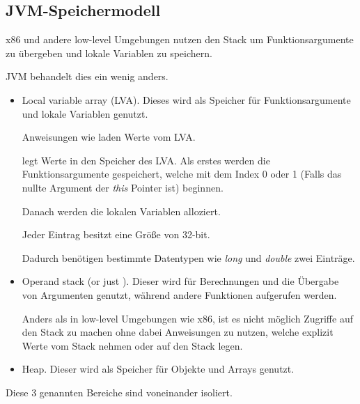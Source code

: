 \subsection{\ac{JVM}-Speichermodell}
x86 und andere low-level Umgebungen nutzen den Stack um Funktionsargumente zu übergeben
und lokale Variablen zu speichern.

\ac{JVM} behandelt dies ein wenig anders.

\begin{itemize}
	\item Local variable array (\ac{LVA}).
	Dieses wird als Speicher für Funktionsargumente und lokale Variablen genutzt.
	
	Anweisungen wie  laden Werte vom LVA.
	
	 legt Werte in den Speicher des LVA. 
	Als erstes werden die Funktionsargumente gespeichert, welche mit dem Index 0 oder 1 
	(Falls das nullte Argument der \emph{this} Pointer ist) beginnen.
	
	Danach werden die lokalen Variablen alloziert.
	
	Jeder Eintrag besitzt eine Größe von 32-bit.
	
	Dadurch benötigen bestimmte Datentypen wie \emph{long} und \emph{double} zwei Einträge.
	
	
	\item Operand stack (or just ).
	Dieser wird für Berechnungen und die Übergabe von Argumenten genutzt, während andere Funktionen aufgerufen werden.
	
	Anders als in low-level Umgebungen wie x86, ist es nicht möglich Zugriffe auf den Stack zu machen ohne dabei Anweisungen zu nutzen, welche explizit Werte vom Stack nehmen oder auf den Stack legen.
	
	\item Heap. Dieser wird als Speicher für Objekte und Arrays genutzt.
	
\end{itemize}

Diese 3 genannten Bereiche sind voneinander isoliert.